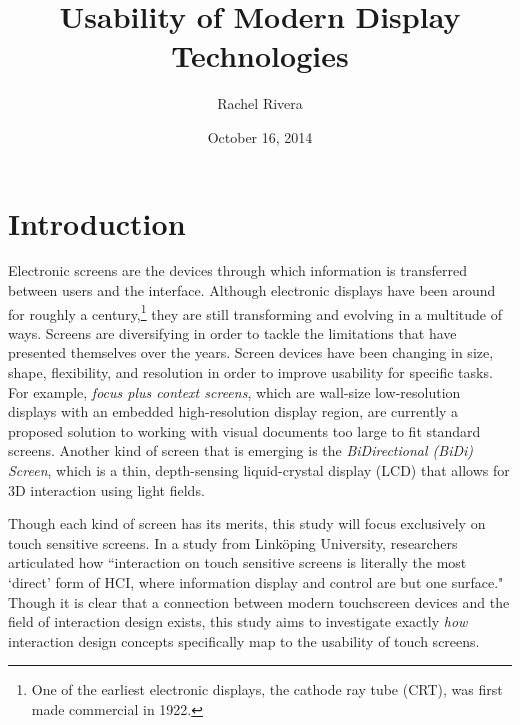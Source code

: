 \documentclass{article}
\title{Usability of Modern Display Technologies}
\author{Rachel Rivera}
\date{October 16, 2014}
\begin{document}
\maketitle


\pagebreak
\tableofcontents


\pagebreak

%
%
\section{Introduction}
\label{introduction}

Electronic screens are the devices through which information is transferred between users and the interface. Although electronic displays have been around for roughly a century,\footnote{One of the earliest electronic displays, the cathode ray tube (CRT),  was first made commercial in 1922.\cite{Cathode}} they are still transforming and evolving in a multitude of ways. Screens are diversifying in order to tackle the limitations that have presented themselves over the years.\cite{Eisenberg} Screen devices have been changing in size, shape, flexibility, and resolution in order to improve usability for specific tasks. For example, \textit{focus plus context screens}, which are wall-size low-resolution displays with an embedded high-resolution display region, are currently a proposed solution to working with visual documents too large to fit standard screens.\cite{Baudisch} Another kind of screen that is emerging is the \textit{BiDirectional (BiDi) Screen}, which is a thin, depth-sensing liquid-crystal display (LCD) that allows for 3D interaction using light fields.\cite{Hirsch} 

 Though each kind of screen has its merits, this study will focus exclusively on touch sensitive screens. In a study from Link\"{o}ping University, researchers articulated how ``interaction on touch sensitive screens is literally the most `direct' form of HCI, where information display and control are but one surface."\cite{Albinsson} Though it is clear that a connection between modern touchscreen devices and the field of interaction design exists, this study aims to investigate exactly \textit{how} interaction design concepts specifically map to the usability of touch screens. 
\end{document}
